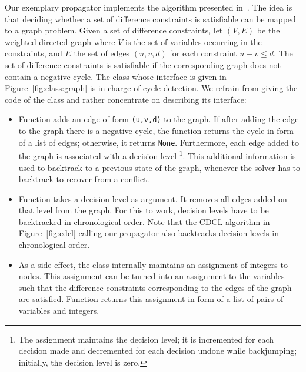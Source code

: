 Our exemplary propagator implements the algorithm presented in~\cite{cotmal06a}.
%
The idea is that deciding whether a set of difference constraints is satisfiable can be mapped to a graph problem.
Given a set of difference constraints, let $(V,E)$ be the weighted directed graph
where $V$ is the set of variables occurring in the constraints,
and $E$ the set of edges $(u, v, d)$ for each constraint $u-v\leq d$.
The set of difference constraints is satisfiable if the corresponding graph does not contain a negative cycle.
%
The  class whose interface is given in Figure~\ref{fig:class:graph} is in charge of cycle detection.
We refrain from giving the code of the  class and rather concentrate on describing its interface:
\begin{itemize}
\item
  Function  adds an edge of form \lstinline{(u,v,d)} to the graph. 
  If after adding the edge to the graph there is a negative cycle,
  the function returns the cycle in form of a list of edges;
  otherwise, it returns \lstinline{None}.
  Furthermore, each edge added to the graph is associated with a decision level%
  \footnote{The assignment maintains the decision level; 
    it is incremented for each decision made and decremented for each decision undone while backjumping; 
    initially, the decision level is zero.}.
  This additional information is used to backtrack to a previous state of the graph,
  whenever the solver has to backtrack to recover from a conflict.
\item
  Function  takes a decision level as argument.
  It removes all edges added on that level from the graph.
  For this to work, decision levels have to be backtracked in chronological order.
  Note that the CDCL algorithm in Figure~\ref{fig:cdcl} calling our propagator also backtracks decision levels in chronological order.
\item
  As a side effect, the  class internally maintains an assignment of integers to nodes.
  This assignment can be turned into an assignment to the variables such that the difference constraints corresponding to the edges of the graph are satisfied.
  Function  returns this assignment in form of a list of pairs of variables and integers.
\end{itemize}

